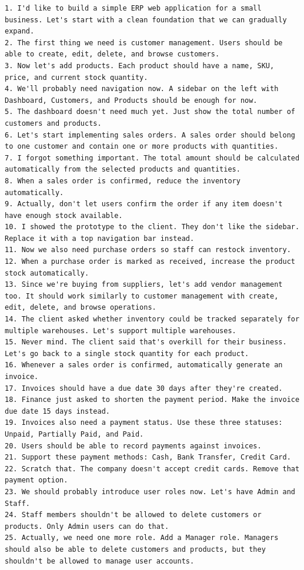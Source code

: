 \begin{lstlisting}[breaklines=true, basicstyle=\small\ttfamily]
1. I'd like to build a simple ERP web application for a small business. Let's start with a clean foundation that we can gradually expand.
2. The first thing we need is customer management. Users should be able to create, edit, delete, and browse customers.
3. Now let's add products. Each product should have a name, SKU, price, and current stock quantity.
4. We'll probably need navigation now. A sidebar on the left with Dashboard, Customers, and Products should be enough for now.
5. The dashboard doesn't need much yet. Just show the total number of customers and products.
6. Let's start implementing sales orders. A sales order should belong to one customer and contain one or more products with quantities.
7. I forgot something important. The total amount should be calculated automatically from the selected products and quantities.
8. When a sales order is confirmed, reduce the inventory automatically.
9. Actually, don't let users confirm the order if any item doesn't have enough stock available.
10. I showed the prototype to the client. They don't like the sidebar. Replace it with a top navigation bar instead.
11. Now we also need purchase orders so staff can restock inventory.
12. When a purchase order is marked as received, increase the product stock automatically.
13. Since we're buying from suppliers, let's add vendor management too. It should work similarly to customer management with create, edit, delete, and browse operations.
14. The client asked whether inventory could be tracked separately for multiple warehouses. Let's support multiple warehouses.
15. Never mind. The client said that's overkill for their business. Let's go back to a single stock quantity for each product.
16. Whenever a sales order is confirmed, automatically generate an invoice.
17. Invoices should have a due date 30 days after they're created.
18. Finance just asked to shorten the payment period. Make the invoice due date 15 days instead.
19. Invoices also need a payment status. Use these three statuses: Unpaid, Partially Paid, and Paid.
20. Users should be able to record payments against invoices.
21. Support these payment methods: Cash, Bank Transfer, Credit Card.
22. Scratch that. The company doesn't accept credit cards. Remove that payment option.
23. We should probably introduce user roles now. Let's have Admin and Staff.
24. Staff members shouldn't be allowed to delete customers or products. Only Admin users can do that.
25. Actually, we need one more role. Add a Manager role. Managers should also be able to delete customers and products, but they shouldn't be allowed to manage user accounts.

\end{lstlisting}
